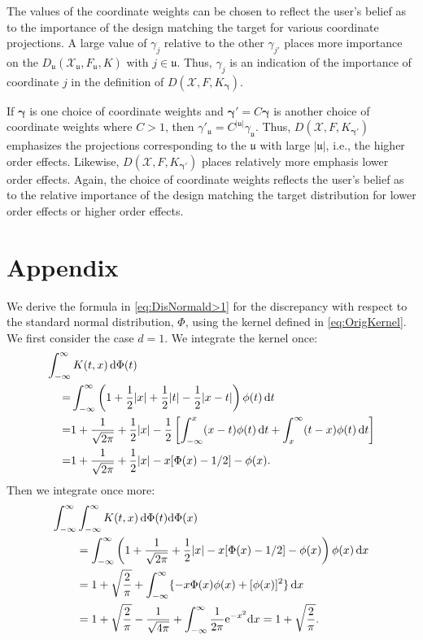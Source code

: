 \documentclass[graybox]{svmult}
\newcommand{\fraku}{\mathfrak{u}}
\newcommand{\dif}{{\rm d}}
\newcommand{\Xdes}{\mathcal{X}}
\newcommand{\vgamma}{\boldsymbol{\gamma}}
\def\abs#1{\ensuremath{\left \lvert #1 \right \rvert}}
\begin{document}
The values of the coordinate weights can be chosen to reflect the user's belief as to the importance of the design matching the target for various coordinate projections.  A large value of $\gamma_j$ relative to the other $\gamma_{j'}$ places more importance on the $D_{\fraku} (\Xdes_\fraku,F_\fraku,K)$ with $j \in \fraku$.  Thus, $\gamma_j$ is an indication of the importance of coordinate $j$ in the definition of $D(\Xdes,F,K_{\vgamma})$.  

If $\vgamma$ is one choice of coordinate weights and $\vgamma'=C\vgamma$ is another choice of coordinate weights where $C > 1$, then $\gamma'_\fraku = C^{\abs{\fraku}} \gamma_\fraku$.  Thus, $D(\Xdes,F,K_{\vgamma'})$ emphasizes the projections corresponding to the $\fraku$ with large $\abs{\fraku}$, i.e., the higher order effects. Likewise, $D(\Xdes,F,K_{\vgamma'})$ places relatively more emphasis lower order effects.  Again, the choice of coordinate weights reflects the user's belief as to the relative importance of the design matching the target distribution for lower order effects or higher order effects.



\section*{Appendix}
We derive the formula in \eqref{eq:DisNormald>1} for the discrepancy with respect to the standard normal distribution, $\Phi$, using the kernel defined in \eqref{eq:OrigKernel}.  We first consider the case $d=1$. We integrate the kernel once:
\begin{align*}
\MoveEqLeft{\int_{-\infty}^\infty K(t,x) \, \dif \Phi(t)}\\
=&\int_{-\infty}^{\infty} \left(1+\frac{1}{2}|x|+\frac{1}{2}|t|-\frac{1}{2}|x-t|\right)\phi(t) \, \dif t\\
=& 1+ \frac{1}{\sqrt{2\pi}} + \frac{1}{2}|x|
-\frac{1}{2}\left[\int_{-\infty}^{x}(x - t)\phi (t) \, \dif t
+\int_{x}^{\infty} (t - x)\phi(t) \, \dif t\right]\\
=& 1+ \frac{1}{\sqrt{2\pi}} + \frac{1}{2}|x| - x [\Phi(x)-1/2] - \phi(x) .
\end{align*}
Then we integrate once more:
\begin{align*}
\MoveEqLeft{\int_{-\infty}^\infty \int_{-\infty}^\infty K(t,x) \, \dif \Phi(t) \dif \Phi(x)}\\
& =  \int_{-\infty}^{\infty} \left(1+ \frac{1}{\sqrt{2\pi}} + \frac{1}{2}|x| - x [\Phi(x)-1/2] - \phi(x) \right)\phi(x) \, \dif x\\
&= 1+ \sqrt{\frac{2}{\pi}} + \int_{-\infty}^{\infty} \{ - x \Phi(x)\phi(x)  +  [\phi(x)]^2 \} \, \dif x\\
&= 1+\sqrt{\frac{2}{\pi}}-\frac{1}{\sqrt{4\pi}}+\int_{-\infty}^{\infty}\frac{1}{2\pi}\mathrm{e}^{-x^2}\dif x =1+\sqrt{\frac{2}{\pi}}. 
\end{align*}
\end{document}
